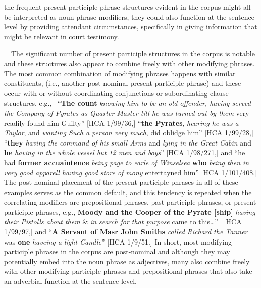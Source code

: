 \begin{styleStandard}
the frequent present participle phrase structures evident in the corpus might all be interpreted as noun phrase modifiers, they could also function at the sentence level by providing attendant circumstances, specifically in giving information that might be relevant in court testimony. 
\end{styleStandard}


\begin{styleStandard}
\ \ The significant number of present participle structures in the corpus is notable and these structures also appear to combine freely with other modifying phrases. The most common combination of modifying phrases happens with similar constituents, (i.e., another post-nominal present participle phrase) and these occur with or without coordinating conjunctions or subordinating clause structures, e.g., \ “\textbf{The count} \textit{knowing him to be an old offender, having served the Company of Pyrates as Quarter Master till he was turned out by them} very readily found him Guilty” [HCA 1/99/36,] “\textbf{the Pyrates}, \textit{hearing he was a Taylor}, and \textit{wanting Such a person very much}, did oblidge him” [HCA 1/99/28,] “\textbf{they }\textit{having the command of his small Arms} and \textit{lying in the Great Cabin} and \textbf{he }\textit{having in the whole vessel but 12 men and boys}” [HCA 1/98/271,] and “he had \textbf{former accuaintence} \textit{being page to earle of Winselsea} \textbf{who }\textit{being then in very good apparell having good store of mony }entertayned him” [HCA 1/101/408.] The post-nominal placement of the present participle phrases in all of these examples serves as the common default, and this tendency is repeated when the correlating modifiers are prepositional phrases, past participle phrases, or present participle phrases, e.g., \textbf{Moody and the Cooper of the Pyrate [ship]} \textit{having their Pistolls about them} \& \textit{in search for that purpose }came to this…” ~[HCA 1/99/97,] and “\textbf{A Servant of Masr John Smiths} \textit{called Richard the Tanner }was \textbf{one} \textit{haveing a light Candle}” [HCA 1/9/51.] In short, most modifying participle phrases in the corpus are post-nominal and although they may potentially embed into the noun phrase as adjectives, many also combine freely with other modifying participle phrases and prepositional phrases that also take an adverbial function at the sentence level. 
\end{styleStandard}



